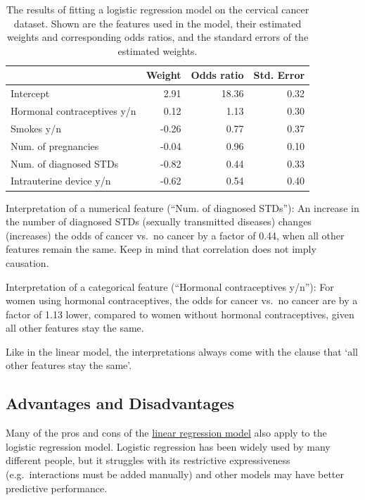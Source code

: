 \documentclass[12pt,]{krantz}
\begin{document}
\begin{table}

\caption{\label{tab:logistic-example}The results of fitting a logistic regression model on the cervical cancer dataset. Shown are the features used in the model, their estimated weights and corresponding odds ratios, and the standard errors of the estimated weights.}
\centering
\begin{tabular}[t]{l|r|r|r}
\hline
  & Weight & Odds ratio & Std. Error\\
\hline
Intercept & 2.91 & 18.36 & 0.32\\
\hline
Hormonal contraceptives y/n & 0.12 & 1.13 & 0.30\\
\hline
Smokes y/n & -0.26 & 0.77 & 0.37\\
\hline
Num. of pregnancies & -0.04 & 0.96 & 0.10\\
\hline
Num. of diagnosed STDs & -0.82 & 0.44 & 0.33\\
\hline
Intrauterine device y/n & -0.62 & 0.54 & 0.40\\
\hline
\end{tabular}
\end{table}

Interpretation of a numerical feature (``Num. of diagnosed STDs''): An
increase in the number of diagnosed STDs (sexually transmitted diseases)
changes (increases) the odds of cancer vs.~no cancer by a factor of
0.44, when all other features remain the same. Keep in mind that
correlation does not imply causation.

Interpretation of a categorical feature (``Hormonal contraceptives
y/n''): For women using hormonal contraceptives, the odds for cancer
vs.~no cancer are by a factor of 1.13 lower, compared to women without
hormonal contraceptives, given all other features stay the same.

Like in the linear model, the interpretations always come with the
clause that `all other features stay the same'.

\subsection{Advantages and
Disadvantages}\label{advantages-and-disadvantages}

Many of the pros and cons of the \protect\hyperlink{limo}{linear
regression model} also apply to the logistic regression model. Logistic
regression has been widely used by many different people, but it
struggles with its restrictive expressiveness (e.g.~interactions must be
added manually) and other models may have better predictive performance.
\end{document}
